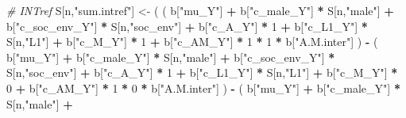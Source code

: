 \documentclass[
]{book}
\newenvironment{Shaded}{\begin{snugshade}}{\end{snugshade}}
\newcommand{\CommentTok}[1]{\textcolor[rgb]{0.56,0.35,0.01}{\textit{#1}}}
\newcommand{\DecValTok}[1]{\textcolor[rgb]{0.00,0.00,0.81}{#1}}
\newcommand{\NormalTok}[1]{#1}
\newcommand{\OtherTok}[1]{\textcolor[rgb]{0.56,0.35,0.01}{#1}}
\newcommand{\SpecialCharTok}[1]{\textcolor[rgb]{0.81,0.36,0.00}{\textbf{#1}}}
\newcommand{\StringTok}[1]{\textcolor[rgb]{0.31,0.60,0.02}{#1}}
\begin{document}
\begin{Shaded}
\begin{Highlighting}[]
    \CommentTok{\# INTref }
\NormalTok{    S[n,}\StringTok{"sum.intref"}\NormalTok{] }\OtherTok{\textless{}{-}}\NormalTok{ ( ( b[}\StringTok{"mu\_Y"}\NormalTok{] }\SpecialCharTok{+} 
\NormalTok{                               b[}\StringTok{"c\_male\_Y"}\NormalTok{] }\SpecialCharTok{*}\NormalTok{ S[n,}\StringTok{"male"}\NormalTok{] }\SpecialCharTok{+} 
\NormalTok{                               b[}\StringTok{"c\_soc\_env\_Y"}\NormalTok{] }\SpecialCharTok{*}\NormalTok{ S[n,}\StringTok{"soc\_env"}\NormalTok{] }\SpecialCharTok{+} 
\NormalTok{                               b[}\StringTok{"c\_A\_Y"}\NormalTok{] }\SpecialCharTok{*} \DecValTok{1} \SpecialCharTok{+} 
\NormalTok{                               b[}\StringTok{"c\_L1\_Y"}\NormalTok{] }\SpecialCharTok{*}\NormalTok{ S[n,}\StringTok{"L1"}\NormalTok{] }\SpecialCharTok{+}
\NormalTok{                               b[}\StringTok{"c\_M\_Y"}\NormalTok{] }\SpecialCharTok{*} \DecValTok{1} \SpecialCharTok{+}
\NormalTok{                               b[}\StringTok{"c\_AM\_Y"}\NormalTok{] }\SpecialCharTok{*} \DecValTok{1} \SpecialCharTok{*} \DecValTok{1} \SpecialCharTok{*}\NormalTok{ b[}\StringTok{"A.M.inter"}\NormalTok{] ) }\SpecialCharTok{{-}} 
\NormalTok{                             ( b[}\StringTok{"mu\_Y"}\NormalTok{] }\SpecialCharTok{+} 
\NormalTok{                                 b[}\StringTok{"c\_male\_Y"}\NormalTok{] }\SpecialCharTok{*}\NormalTok{ S[n,}\StringTok{"male"}\NormalTok{] }\SpecialCharTok{+} 
\NormalTok{                                 b[}\StringTok{"c\_soc\_env\_Y"}\NormalTok{] }\SpecialCharTok{*}\NormalTok{ S[n,}\StringTok{"soc\_env"}\NormalTok{] }\SpecialCharTok{+} 
\NormalTok{                                 b[}\StringTok{"c\_A\_Y"}\NormalTok{] }\SpecialCharTok{*} \DecValTok{1} \SpecialCharTok{+} 
\NormalTok{                                 b[}\StringTok{"c\_L1\_Y"}\NormalTok{] }\SpecialCharTok{*}\NormalTok{ S[n,}\StringTok{"L1"}\NormalTok{] }\SpecialCharTok{+}
\NormalTok{                                 b[}\StringTok{"c\_M\_Y"}\NormalTok{] }\SpecialCharTok{*} \DecValTok{0} \SpecialCharTok{+}
\NormalTok{                                 b[}\StringTok{"c\_AM\_Y"}\NormalTok{] }\SpecialCharTok{*} \DecValTok{1} \SpecialCharTok{*} \DecValTok{0} \SpecialCharTok{*}\NormalTok{ b[}\StringTok{"A.M.inter"}\NormalTok{] ) }\SpecialCharTok{{-}} 
\NormalTok{                             ( b[}\StringTok{"mu\_Y"}\NormalTok{] }\SpecialCharTok{+} 
\NormalTok{                                 b[}\StringTok{"c\_male\_Y"}\NormalTok{] }\SpecialCharTok{*}\NormalTok{ S[n,}\StringTok{"male"}\NormalTok{] }\SpecialCharTok{+} 

\end{Highlighting}
\end{Shaded}
\end{document}

